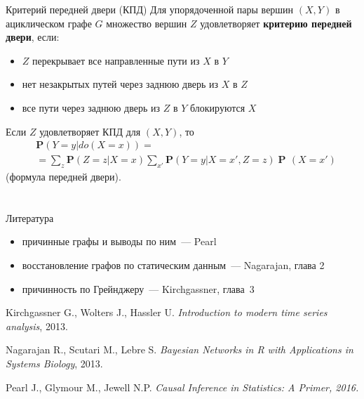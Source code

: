 \documentclass[9pt,pdf,utf8,hyperref={unicode},aspectratio=169]{beamer}
\DeclareMathOperator{\prob}{\mathbf{P}\!}
\newcommand{\condprob}[2] {\mathbf{P}\!\left(#1\left|#2\right.\right)}
\begin{document}
\begin{frame}{Критерий передней двери (КПД)}
Для упорядоченной пары вершин $(X,Y)$ в ациклическом графе $G$ множество вершин $Z$ удовлетворяет \textbf{критерию передней двери}, если:
\begin{itemize}
\item $Z$ перекрывает все направленные пути из $X$ в $Y$
\item нет незакрытых путей через заднюю дверь из $X$ в $Z$
\item все пути через заднюю дверь из $Z$ в $Y$ блокируются $X$
\end{itemize}

\bigskip

Если $Z$ удовлетворяет КПД для $(X,Y)$, то 
\begin{align*}
&\condprob{Y =y}{do\left(X = x\right)} = \\
&=\sum_z \condprob{Z=z}{X=x}\sum_{x'} \condprob{Y=y}{X=x', Z=z}  \prob\left(X=x'\right)
\end{align*}
(формула передней двери).
\end{frame}

\section{}
\begin{frame}{Литература}
    \begin{itemize}
    \item причинные графы и выводы по ним~--- Pearl
    \item восстановление графов по статическим данным~--- Nagarajan, глава 2
	\item причинность по Грейнджеру~--- Kirchgassner, глава~3
    \end{itemize}

	\bigskip
   
	Kirchgassner G., Wolters J., Hassler U. {\em Introduction to modern time series analysis}, 2013.
	
	\bigskip
			
	Nagarajan R., Scutari M., Lebre S. {\em Bayesian Networks in R with Applications in Systems Biology}, 2013. 
	
	\bigskip
			
	Pearl J., Glymour M., Jewell N.P. \em{Causal Inference in Statistics: A Primer}, 2016.
\end{frame}
\end{document}
